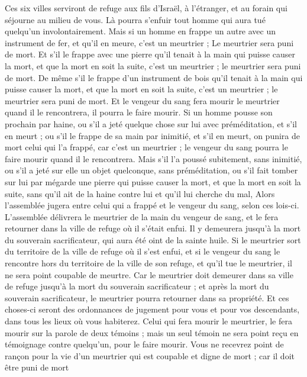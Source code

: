 \begin{multicols}{2}
Ces six villes serviront de refuge aux fils d'Israël, à l'étranger, et au forain qui séjourne au milieu de vous. Là pourra s’enfuir tout homme qui aura tué quelqu’un involontairement.
Mais si un homme en frappe un autre avec un instrument de fer, et qu'il en meure, c’est un meurtrier ; Le meurtrier sera puni de mort.
Et s’il le frappe avec une pierre qu’il tenait à la main qui puisse causer la mort, et que la mort en soit la suite, c'est un meurtrier ; le meurtrier sera puni de mort.
De même s’il le frappe d’un instrument de bois qu’il tenait à la main qui puisse causer la mort, et que la mort en soit la suite, c'est un meurtrier ; le meurtrier sera puni de mort.
Et le vengeur du sang fera mourir le meurtrier quand il le rencontrera, il pourra le faire mourir.
Si un homme pousse son prochain par haine, ou s'il a jeté quelque chose sur lui avec préméditation, et s'il en meurt ;
ou s’il le frappe de sa main par inimitié, et s'il en meurt, on punira de mort celui qui l'a frappé, car c’est un meurtrier ; le vengeur du sang pourra le faire mourir quand il le rencontrera.
Mais s'il l'a poussé subitement, sans inimitié, ou s'il a jeté sur elle un objet quelconque, sans préméditation,
ou s’il fait tomber sur lui par mégarde une pierre qui puisse causer la mort, et que la mort en soit la suite, sans qu'il ait de la haine contre lui et qu’il lui cherche du mal,
Alors l'assemblée jugera entre celui qui a frappé et le vengeur du sang, selon ces lois-ci.
L'assemblée délivrera le meurtrier de la main du vengeur de sang, et le fera retourner dans la ville de refuge où il s'était enfui. Il y demeurera jusqu'à la mort du souverain sacrificateur, qui aura été oint de la sainte huile.
Si le meurtrier sort du territoire de la ville de refuge où il s'est enfui,
et si le vengeur du sang le rencontre hors du territoire de la ville de son refuge, et qu'il tue le meurtrier, il ne sera point coupable de meurtre.
Car le meurtrier doit demeurer dans sa ville de refuge jusqu'à la mort du souverain sacrificateur ; et après la mort du souverain sacrificateur, le meurtrier pourra retourner dans sa propriété.
Et ces choses-ci seront des ordonnances de jugement pour vous et pour vos descendants, dans tous les lieux où vous habiterez.
Celui qui fera mourir le meurtrier, le fera mourir sur la parole de deux témoins ; mais un seul témoin ne sera point reçu en témoignage contre quelqu'un, pour le faire mourir.
Vous ne recevrez point de rançon pour la vie d'un meurtrier qui est coupable et digne de mort ; car il doit être puni de mort

\end{multicols}
